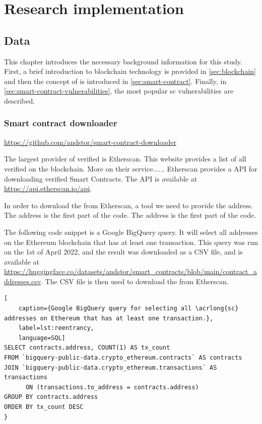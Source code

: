 \chapter{Research implementation}
\label{chap:implementation}

\section{Data}
\label{sec:data}
This chapter introduces the necessary background information for this study. First, a brief introduction to blockchain technology is provided in \cref{sec:blockchain} and then the concept of  is introduced in \cref{sec:smart-contract}. Finally, in \cref{sec:smart-contract-vulnerabilities}, the most popular \acrshort{sc} vulnerabilities are described.

\subsection{Smart contract downloader}
\label{sec:smart-contract-downloader}
\url{https://github.com/andstor/smart-contract-downloader}


The largest provider of verified  is Etherscan. This website provides a list of all verified  on the blockchain. More on their service...... Etherscan provides a API for downloading verified Smart Contracts. The API is available at \url{https://api.etherscan.io/api}.

In order to download the  from Etherscan, a tool we need to provide the  address. The address is the first part of the  code. The address is the first part of the  code.

The following code snippet is a Google BigQuery query. It will select all  addresses on the Ethereum blockchain that has at least one transaction. This query was run on the 1st of April 2022, and the result was downloaded as a CSV file, and is available at \url{https://huggingface.co/datasets/andstor/smart_contracts/blob/main/contract_addresses.csv}. The CSV file is then used to download the  from Etherscan.

\begin{lstlisting}[
    caption={Google BigQuery query for selecting all \acrlong{sc} addresses on Ethereum that has at least one transaction.},
    label=lst:reentrancy,
    language=SQL]
SELECT contracts.address, COUNT(1) AS tx_count
FROM `bigquery-public-data.crypto_ethereum.contracts` AS contracts
JOIN `bigquery-public-data.crypto_ethereum.transactions` AS transactions 
      ON (transactions.to_address = contracts.address)
GROUP BY contracts.address
ORDER BY tx_count DESC
}
\end{lstlisting}

